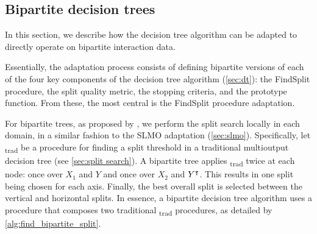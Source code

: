 

\subsection{Bipartite decision trees}
\label{sec:bipartite_trees}

In this section, we describe how the decision tree algorithm can be adapted to directly operate on bipartite interaction data.

Essentially, the adaptation process consists of defining bipartite versions of each of the four key components of the decision tree algorithm (\autoref{sec:dt}): the FindSplit procedure, the split quality metric, the stopping criteria, and the prototype function. From these, the most central is the FindSplit procedure adaptation.
 
For bipartite trees, as proposed by , we perform the split search locally in each domain, in a similar fashion to the SLMO adaptation (\autoref{sec:slmo}).
%
%
Specifically, let \FindSplit\textsubscript{trad} be a procedure for finding a split threshold in a traditional multioutput decision tree (see \autoref{sec:split search}).
A bipartite tree applies \FindSplit\textsubscript{trad} twice at each node: once over $X_1$ and $Y$ and once over $X_2$ and $Y^\intercal$. This results in one split being chosen for each axis.
Finally, the best overall split is selected between the vertical and horizontal splits.
In essence, a bipartite decision tree algorithm uses a \FindSplit procedure that composes two traditional \FindSplit\textsubscript{trad} procedures, as detailed by \autoref{alg:find_bipartite_split}.

